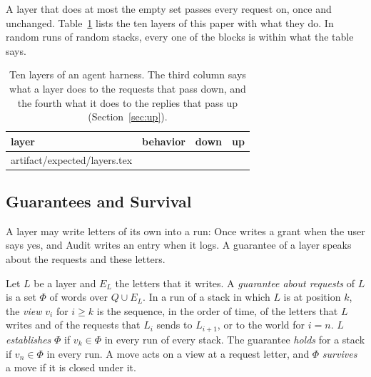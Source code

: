 \documentclass[acmsmall,nonacm,screen]{acmart}
\makeatletter
\newcommand{\ly}[1]{\textsf{#1}}
\newcommand{\claim}[2]{#2}
\newcommand{\rows}[1]{\@@input artifact/expected/#1.tex }
\makeatother
\begin{document}
A layer that does at most the empty set passes every request on, once and unchanged.
Table~\ref{tab:layers} lists the ten layers of this paper with what they do.
\claim{blocks-within}{In \exBlockRuns{} random runs of random stacks, every one of the
\exBlocks{} blocks is within what the table says.}

\begin{table}
\caption{Ten layers of an agent harness. The third column says what a layer does to the
requests that pass down, and the fourth what it does to the replies that pass up
(Section~\ref{sec:up}).}
\label{tab:layers}
\small
\begin{tabular}{lp{6.4cm}lp{3.1cm}}
\toprule
layer & behavior & down & up \\
\midrule
\rows{layers}
\bottomrule
\end{tabular}
\end{table}

\subsection{Guarantees and Survival}

A layer may write letters of its own into a run: \ly{Once} writes a grant when the user says
yes, and \ly{Audit} writes an entry when it logs. A guarantee of a layer speaks about the
requests and these letters.

\begin{definition}
\label{def:guarantee}
Let $L$ be a layer and $E_L$ the letters that it writes. A \emph{guarantee about requests} of
$L$ is a set $\Phi$ of words over $Q \cup E_L$. In a run of a stack in which $L$ is at
position $k$, the \emph{view} $v_i$ for $i \ge k$ is the sequence, in the order of time, of
the letters that $L$ writes and of the requests that $L_i$ sends to $L_{i+1}$, or to the
world for $i = n$. $L$ \emph{establishes} $\Phi$ if $v_k \in \Phi$ in every run of every
stack. The guarantee \emph{holds} for a stack if $v_n \in \Phi$ in every run. A move acts on
a view at a request letter, and $\Phi$ \emph{survives} a move if it is closed under it.
\end{definition}
\end{document}
